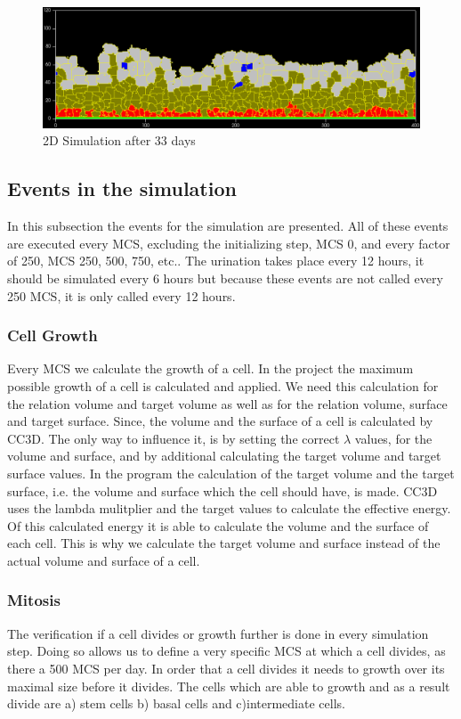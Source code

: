 \begin{figure}
	\center
	\includegraphics[scale=0.35]{figures/2DSimulation-33Days.png}
	\caption{2D Simulation after 33 days}
	\label{img:2DSimulation33Days}
\end{figure}

\subsection{Events in the simulation}
In this subsection the events for the simulation are presented. All of these events are executed every \ac{MCS}, excluding the initializing step, \ac{MCS} 0, and every factor of 250, \ac{MCS} 250, 500, 750, etc.. \newline
The urination takes place every 12 hours, it should be simulated every 6 hours but because these events are not called every 250 \ac{MCS}, it is only called every 12 hours.

\subsubsection{Cell Growth}
Every \ac{MCS} we calculate the growth of a cell. In the project the maximum possible growth of a cell is calculated and applied.  We need this calculation for the relation volume and target volume as well as for the relation volume, surface and target surface. Since, the volume and the surface of a cell is calculated by \ac{CC3D}. The only way to influence it, is by setting the correct $\lambda$ values, for the volume and surface, and by additional calculating the target volume and target surface values. In the program the calculation of the target volume and the target surface, i.e. the volume and surface which the cell should have, is made. \ac{CC3D} uses the lambda mulitplier and the target values to calculate the effective energy. Of this calculated energy it is able to calculate the volume and the surface of each cell. This is why we calculate the target volume and surface instead of the actual volume and surface of a cell.

\subsubsection{Mitosis}
The verification if a cell divides or growth further is done in every simulation step. Doing so allows us to define a very specific \ac{MCS} at which a cell divides, as there a 500 \ac{MCS} per day. In order that a cell divides it needs to growth over its maximal size before it divides.
The cells which are able to growth and as a result divide are a) stem cells b) basal cells and c)intermediate cells. 

